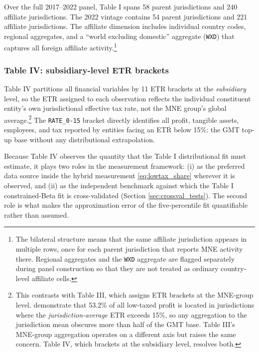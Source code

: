 \documentclass[11pt,a4paper]{article}
\newcommand{\code}[1]{\texttt{#1}}
\begin{document}
Over the full 2017--2022 panel, Table I spans 58 parent jurisdictions and 240 affiliate jurisdictions. The 2022 vintage contains 54 parent jurisdictions and 221 affiliate jurisdictions. The affiliate dimension includes individual country codes, regional aggregates, and a ``world excluding domestic'' aggregate (\code{WXD}) that captures all foreign affiliate activity.\footnote{The bilateral structure means that the same affiliate jurisdiction appears in multiple rows, once for each parent jurisdiction that reports MNE activity there. Regional aggregates and the \code{WXD} aggregate are flagged separately during panel construction so that they are not treated as ordinary country-level affiliate cells.}

\subsubsection{Table IV: subsidiary-level ETR brackets}\label{sec:t4_main}

Table IV partitions all financial variables by 11 ETR brackets at the \emph{subsidiary} level, so the ETR assigned to each observation reflects the individual constituent entity's own jurisdictional effective tax rate, not the MNE group's global average.\footnote{This contrasts with Table III, which assigns ETR brackets at the MNE-group level. \citet{hugger2026} demonstrate that 53.2\% of all low-taxed profit is located in jurisdictions where the \emph{jurisdiction-average} ETR exceeds 15\%, so any aggregation to the jurisdiction mean obscures more than half of the GMT base. Table III's MNE-group aggregation operates on a different axis but raises the same concern. Table IV, which brackets at the subsidiary level, resolves both.} The \code{RATE\_0-15} bracket directly identifies all profit, tangible assets, employees, and tax reported by entities facing an ETR below 15\%: the GMT top-up base without any distributional extrapolation.

Because Table IV observes the quantity that the Table I distributional fit must estimate, it plays two roles in the measurement framework: (i) as the preferred data source inside the hybrid measurement \eqref{eq:lowtax_share} wherever it is observed, and (ii) as the independent benchmark against which the Table I constrained-Beta fit is cross-validated (Section \ref{sec:crossval_tests}). The second role is what makes the approximation error of the five-percentile fit quantifiable rather than assumed.
\end{document}
